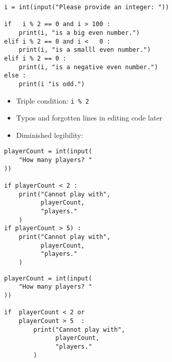 \begin{frame}[fragile]
%
\begin{warnbox}[Redundancy with \texttt{if} and Logical Operators: \texttt{elif}, leftupper=6mm]
\begin{verbatim}
i = int(input("Please provide an integer: "))

if   i % 2 == 0 and i > 100 :
    print(i, "is a big even number.")
elif i % 2 == 0 and i <   0 :
    print(i, "is a smalll even number.")
elif i % 2 == 0 :
    print(i, "is a negative even number.")
else :
    print(i "is odd.")
\end{verbatim}
\end{warnbox}
%
\begin{itemize}
\item Triple condition: \texttt{i \% 2}
\item Typos and forgotten lines in editing code later
\item Diminished legibility: 
\end{itemize}
%
\end{frame}


\begin{frame}[fragile]
%
\begin{tcbraster}[raster columns=2,
                  raster equal height,
                  nobeforeafter,
                  raster column skip=0.5cm]
	\begin{warnbox}[Validity Check: Sequence of \texttt{if}s, leftupper=7mm]
	\begin{verbatim}
playerCount = int(input(
    "How many players? "
))
      
if playerCount < 2 :
    print("Cannot play with", 
          playerCount, 
          "players."
    )
if playerCount > 5) :
    print("Cannot play with", 
          playerCount,
          "players."
    )
	\end{verbatim}
	\end{warnbox}
%
	\begin{codebox}
	\begin{verbatim}
playerCount = int(input(
    "How many players? "
))
      
if  playerCount < 2 or
    playerCount > 5  :
        print("Cannot play with",
              playerCount,
              "players."
        )
	\end{verbatim}
	\end{codebox}
\end{tcbraster}
%
\end{frame}

